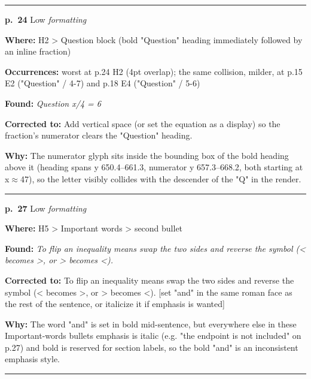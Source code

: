 \documentclass[11pt]{article}
\newcommand{\sevlow}[1]{\textcolor{black!55}{#1}}
\begin{document}
\noindent\rule{\textwidth}{0.4pt}\par\nobreak\vspace{2pt}
\noindent\textbf{p.~24} \quad \sevlow{Low} \quad \textit{formatting}\par
\noindent\textbf{Where: }H2 > Question block (bold "Question" heading immediately followed by an inline fraction)\par
\noindent\textbf{Occurrences: }worst at p.24 H2 (4pt overlap); the same collision, milder, at p.15 E2 ("Question" / 4-7) and p.18 E4 ("Question" / 5-6)\par
\noindent\textbf{Found: }\textit{Question x/4 = 6}\par
\noindent\textbf{Corrected to: }Add vertical space (or set the equation as a display) so the fraction's numerator clears the "Question" heading.\par
\noindent\textbf{Why: }The numerator glyph sits inside the bounding box of the bold heading above it (heading spans y 650.4--661.3, numerator y 657.3--668.2, both starting at x$\approx$47), so the letter visibly collides with the descender of the "Q" in the render.\par\vspace{4pt}
\noindent\rule{\textwidth}{0.4pt}\par\nobreak\vspace{2pt}
\noindent\textbf{p.~27} \quad \sevlow{Low} \quad \textit{formatting}\par
\noindent\textbf{Where: }H5 > Important words > second bullet\par
\noindent\textbf{Found: }\textit{To flip an inequality means swap the two sides and reverse the symbol (< becomes >, or > becomes <).}\par
\noindent\textbf{Corrected to: }To flip an inequality means swap the two sides and reverse the symbol (< becomes >, or > becomes <). [set "and" in the same roman face as the rest of the sentence, or italicize it if emphasis is wanted]\par
\noindent\textbf{Why: }The word "and" is set in bold mid-sentence, but everywhere else in these Important-words bullets emphasis is italic (e.g. "the endpoint is not included" on p.27) and bold is reserved for section labels, so the bold "and" is an inconsistent emphasis style.\par\vspace{4pt}
\noindent\rule{\textwidth}{0.4pt}\par\nobreak\vspace{2pt}
\end{document}
